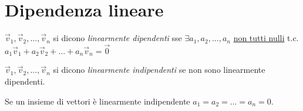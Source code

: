 \section{Dipendenza lineare}
$\vec{v}_1, \vec{v}_2, ..., \vec{v}_n$ si dicono \emph{linearmente dipendenti} sse $\exists a_1, a_2, ..., a_n$
\underline{non tutti nulli} t.c. $a_1\vec{v}_1 + a_2\vec{v}_2 + ... + a_n\vec{v}_n = \vec{0}$

$\vec{v}_1, \vec{v}_2, ..., \vec{v}_n$ si dicono \emph{linearmente indipendenti} se non sono linearmente
dipendenti.

Se un insieme di vettori è linearmente indipendente $a_1 = a_2 = ... = a_n = 0$.
